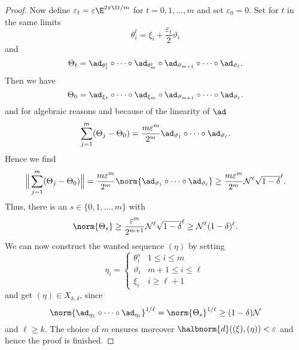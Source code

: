 \documentclass[
11pt,                          %
english                        %
]{article}
\begin{document}
\begin{proof}
	Now define $\varepsilon_t = \varepsilon \E^{2 \pi \I t/m} $ for $t = 0, 1, 
	\ldots, m$ and set $\varepsilon_0 = 0$. Set for $t$ in the same limits
	\begin{equation*}
		\theta_i^t
		=
		\xi_i + \frac{\varepsilon_t}{2} \vartheta_i
	\end{equation*}
	and
	\begin{equation*}
		\Theta_t
		=
		\ad_{\theta_1^t} \circ \cdots \circ \ad_{\theta_m^t}
		\circ
		\ad_{\vartheta_{m+1}} \circ \cdots \circ \ad_{\vartheta_\ell}.
	\end{equation*}
	Then we have
	\begin{equation*}
		\Theta_0
		=
		\ad_{\xi_1} \circ \cdots \circ \ad_{\xi_m}
		\circ
		\ad_{\vartheta_{m+1}} \circ \cdots \circ \ad_{\vartheta_\ell}.
	\end{equation*}
	and for algebraic reasons and because of the linearity of $\ad$
	\begin{equation*}
		\sum\limits_{j=1}^m
		(\Theta_j - \Theta_0)
		=
		\frac{m \varepsilon^m}{2^m}
		\ad_{\vartheta_1} \circ \cdots \circ \ad_{\vartheta_\ell}.
	\end{equation*}
	Hence we find
	\begin{equation*}
		\Big\Vert
			\sum\limits_{j=1}^m
			(\Theta_j - \Theta_0)
		\Big\Vert
		=
		\frac{m \varepsilon^m}{2^m}
		\norm{ \ad_{\vartheta_1} \circ \cdots \circ \ad_{\vartheta_\ell} }
		\geq
		\frac{m \varepsilon^m}{2^m}
		\mathcal{N}^\ell
		\sqrt{1-\delta}^\ell.
	\end{equation*}
	Thus, there is an $s \in \{0, 1, \ldots, m\}$ with
	\begin{equation*}
		\norm{\Theta_s}
		\geq
		\frac{\varepsilon^m}{2^{m + 1}}
		\mathcal{N}^\ell
		\sqrt{1- \delta}^\ell
		\geq
		\mathcal{N}^\ell (1- \delta)^\ell.
	\end{equation*}
	We can now construct the wanted sequence $(\eta)$ by setting
	\begin{equation*}
		\eta_i
		=
		\begin{cases}
			\theta_i^s
			&
			1 \leq i \leq m
			\\
			\vartheta_i
			&
			m+1 \leq i \leq \ell
			\\
			\xi_i
			&
			i \geq \ell + 1
		\end{cases}
	\end{equation*}
	and get $(\eta) \in X_{k, \delta}$, since
	\begin{equation*}
		\norm{ \ad_{\eta_1} \circ \cdots \circ \ad_{\eta_\ell}}^{1/\ell}
		=
		\norm{ \Theta_s }^{1/\ell}
		\geq
		(1 - \delta) \mathcal{N}
	\end{equation*}
	and $\ell \geq k$. The choice of $m$ ensures moreover $\halbnorm{d}((\xi), 
	(\eta)) < \varepsilon$ and hence the proof is finished.
\end{proof}
\end{document}
